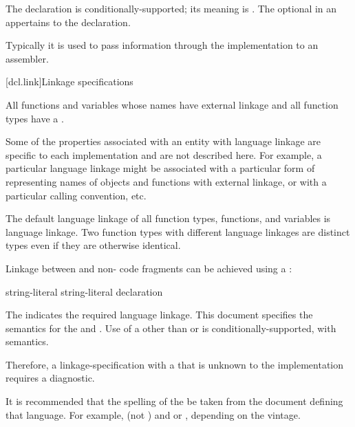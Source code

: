 The  declaration is conditionally-supported; its meaning is
.
The optional  in
an  appertains to the  declaration.
\begin{note}
Typically it is used to pass information through the implementation to
an assembler.
\end{note}

[dcl.link]{Linkage specifications}%

\pnum
All functions and variables whose names have external linkage
and all function types
have a .
\begin{note}
Some of the properties associated with an entity with language linkage
are specific to each implementation and are not described here. For
example, a particular language linkage might be associated with a
particular form of representing names of objects and functions with
external linkage, or with a particular calling convention, etc.
\end{note}
The default language linkage of all function types, functions, and
variables is \Cpp{} language linkage. Two function types with
different language linkages are distinct types even if they are
otherwise identical.

\pnum
Linkage between \Cpp{} and  non-\Cpp{} code fragments can
be achieved using a :

%
%
%
\begin{bnf}
\br
     string-literal \terminal{\{}  \terminal{\}}\br
     string-literal declaration
\end{bnf}

The  indicates the required language linkage.
This document specifies the semantics for the
  and . Use of a
 other than  or  is
conditionally-supported, with  semantics.
\begin{note}
Therefore, a linkage-specification with a  that
is unknown to the implementation requires a diagnostic.
\end{note}
\begin{note}
It is recommended that the spelling of the  be
taken from the document defining that language. For example, 
(not ) and  or , depending on
the vintage.
\end{note}

